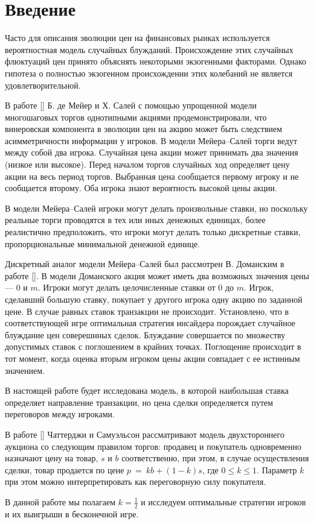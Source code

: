 \section{Введение}
Часто для описания эволюции цен на финансовых рынках используется вероятностная модель случайных блужданий. Происхождение этих случайных флюктуаций цен принято объяснять некоторыми экзогенными факторами. Однако гипотеза о полностью экзогенном происхождении этих колебаний не является удовлетворительной.

В работе [\demeyer] Б. де Мейер и Х. Салей с помощью упрощенной модели многошаговых торгов однотипными акциями продемонстрировали, что винеровская компонента в эволюции цен на акцию может быть следствием асимметричности информации у игроков. 
В модели Мейера--Салей торги ведут между собой два игрока.
Случайная цена акции может принимать два значения (низкое или высокое).
Перед началом торгов случайных ход определяет цену акции на весь период торгов.
Выбранная цена сообщается первому игроку и не сообщается второму. 
Оба игрока знают вероятность высокой цены акции.

В модели Мейера--Салей игроки могут делать произвольные ставки, но поскольку реальные торги проводятся в тех или иных денежных единицах, более реалистично предположить, что игроки могут делать только дискретные ставки, пропорциональные минимальной денежной единице.
 
Дискретный аналог модели Мейера--Салей был рассмотрен В. Доманским в работе [\domansky]. В модели Доманского акция может иметь два возможных значения цены --- $ 0 $ и $ m $. Игроки могут делать целочисленные ставки от $ 0 $ до $ m $. Игрок, сделавший большую ставку, покупает у другого игрока одну акцию по заданной цене. В случае равных ставок транзакции не происходит. Установлено, что в соответствующей игре оптимальная стратегия инсайдера порождает случайное блуждание цен соверешнных сделок. Блуждание совершается по множеству допустимых ставок с поглошением в крайних точках. Поглощение происходит в тот момент, когда оценка вторым игроком цены акции совпадает с ее истинным значением.

В настоящей работе будет исследована модель, в которой наибольшая ставка определяет направление транзакции, но цена сделки определяется путем переговоров между игроками. 

В работе [\samuelson] Чаттерджи и Самуэльсон рассматривают модель двухстороннего аукциона со следующим правилом торгов: продавец и покупатель одновременно назначают цену на товар, $ s $ и $ b $ соответственно, при этом, в случае осуществления сделки, товар продается по цене $ p~=~kb + (1-k)s $, где $ 0 \leq k \leq 1  $. Параметр $ k $ при этом можно интерпретировать как переговорную силу покупателя. 

В данной работе мы полагаем $ k = \frac{1}{2} $ и исследуем оптимальные стратегии игроков и их выигрыши в бесконечной игре.